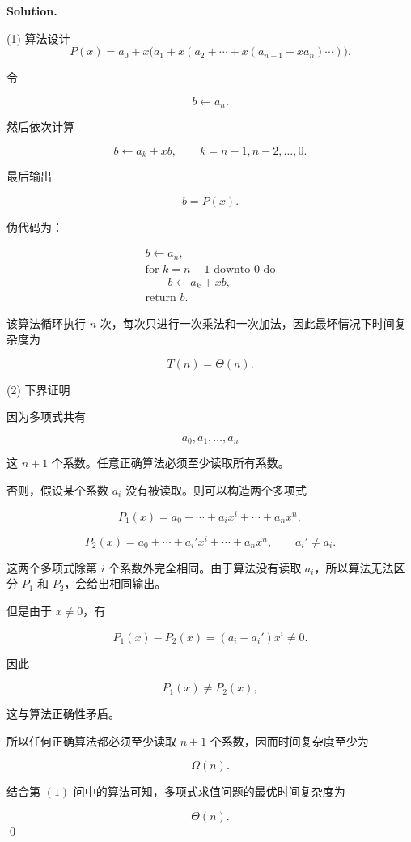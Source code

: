 \documentclass[11pt]{article}
\newenvironment{solution}{
\par\noindent\textbf{Solution.}\par\noindent
}{\qed}
\begin{document}
\begin{solution}

(1) 算法设计
\[
P(x)=a_0+x\bigl(a_1+x(a_2+\cdots+x(a_{n-1}+xa_n)\cdots)\bigr).
\]

令

\[
b\leftarrow a_n.
\]

然后依次计算

\[
b\leftarrow a_k+xb,\qquad k=n-1,n-2,\ldots,0.
\]

最后输出

\[
b=P(x).
\]

伪代码为：

\[
\begin{array}{l}
b\leftarrow a_n,\\
\text{for } k=n-1 \text{ downto } 0 \text{ do}\\
\qquad b\leftarrow a_k+xb,\\
\text{return } b.
\end{array}
\]

该算法循环执行 $n$ 次，每次只进行一次乘法和一次加法，因此最坏情况下时间复杂度为

\[
T(n)=\Theta(n).
\]

(2) 下界证明

因为多项式共有

\[
a_0,a_1,\ldots,a_n
\]

这 $n+1$ 个系数。任意正确算法必须至少读取所有系数。

否则，假设某个系数 $a_i$ 没有被读取。则可以构造两个多项式

\[
P_1(x)=a_0+\cdots+a_ix^i+\cdots+a_nx^n,
\]

\[
P_2(x)=a_0+\cdots+a_i'x^i+\cdots+a_nx^n,
\qquad a_i'\neq a_i.
\]

这两个多项式除第 $i$ 个系数外完全相同。由于算法没有读取 $a_i$，所以算法无法区分 $P_1$ 和 $P_2$，会给出相同输出。

但是由于 $x\neq 0$，有

\[
P_1(x)-P_2(x)=(a_i-a_i')x^i\neq 0.
\]

因此

\[
P_1(x)\neq P_2(x),
\]

这与算法正确性矛盾。

所以任何正确算法都必须至少读取 $n+1$ 个系数，因而时间复杂度至少为

\[
\Omega(n).
\]

结合第 $(1)$ 问中的算法可知，多项式求值问题的最优时间复杂度为

\[
\Theta(n).
\]
\end{solution}
\end{document}
